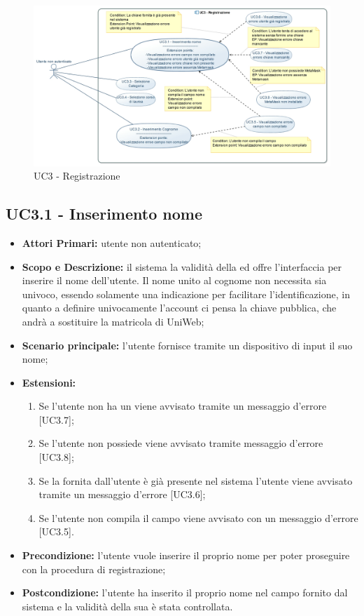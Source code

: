 \documentclass[AnalisiDeiRequisiti.tex]{subfiles}
\begin{document}
\begin{figure}[H]
	\centering
	\includegraphics[width=1.0\linewidth]{UC3.jpg}
	\caption{UC3 - Registrazione}
	\label{fig:UC3 - Registrazione}
\end{figure}


\subsection{UC3.1 - Inserimento nome}
\begin{itemize}
	\item \textbf{Attori Primari:} utente non autenticato;
	\item \textbf{Scopo e Descrizione:} il sistema  la validità della  ed offre l'interfaccia per inserire il nome dell'utente. Il nome unito al cognome non necessita sia univoco, essendo solamente una indicazione per facilitare l'identificazione, in quanto a definire univocamente l'account ci pensa la chiave pubblica, che andrà a sostituire la matricola di UniWeb;
	\item \textbf{Scenario principale:} l'utente fornisce tramite un dispositivo di input il suo nome;
	\item \textbf{Estensioni:}
		\begin{enumerate}
			\item Se l'utente non ha un  viene avvisato tramite un messaggio d'errore [UC3.7];
			\item Se l'utente non possiede  viene avvisato tramite messaggio d'errore [UC3.8];
			\item Se la  fornita dall'utente è già presente nel sistema l'utente viene avvisato tramite un messaggio d'errore [UC3.6];
			\item Se l'utente non compila il campo viene avvisato con un messaggio d'errore [UC3.5].
		\end{enumerate}
	\item \textbf{Precondizione:} l'utente vuole inserire il proprio nome per poter proseguire con la procedura di registrazione;
	\item \textbf{Postcondizione:} l'utente ha inserito il proprio nome nel campo fornito dal sistema e la validità della sua  è stata controllata.
\end{itemize}	
\end{document}
